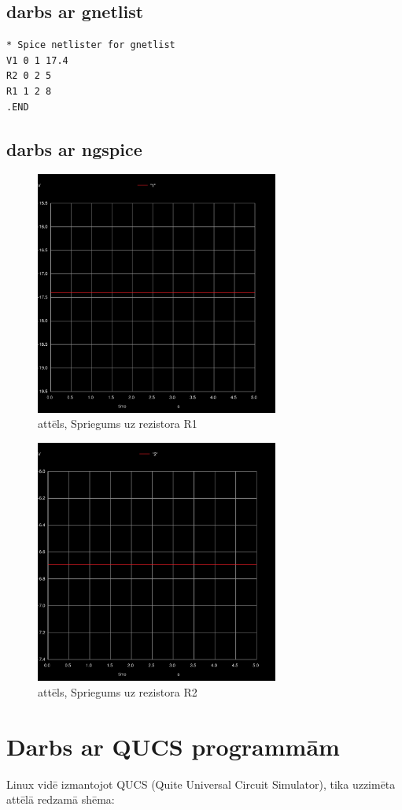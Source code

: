 \documentclass[a4paper,10pt]{report}
\begin{document}
\subsection{darbs ar gnetlist}
\begin{verbatim}
* Spice netlister for gnetlist
V1 0 1 17.4
R2 0 2 5
R1 1 2 8
.END
\end{verbatim}
\subsection{darbs ar ngspice}
\begin{figure}[H]
\includegraphics[width=8cm,height=8cm,keepaspectratio]{011.jpg}
\caption{attēls, Spriegums uz rezistora R1}
\end{figure}
\begin{figure}[H]
\includegraphics[width=8cm,height=8cm,keepaspectratio]{022.jpg}
\caption{attēls, Spriegums uz rezistora R2}
\end{figure}
\section{Darbs ar QUCS programmām}
Linux vidē izmantojot QUCS (Quite Universal Circuit Simulator),
tika uzzimēta attēlā redzamā shēma:
\end{document}
